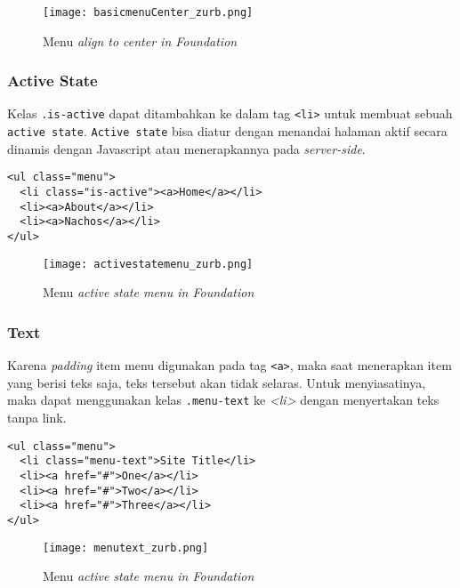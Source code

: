 \begin{enumerate}
\begin{figure} [H]
	\centering  
	\texttt{[image: basicmenuCenter\_zurb.png]}  
	\caption{Menu \textit{align to center in Foundation}}
	\label{fig:gridbasic_zurb} 
\end{figure}

\subsubsection{Active State}
\label{sssec:navigation_3}
Kelas \texttt{.is-active} dapat ditambahkan ke dalam tag \texttt{<li>} untuk membuat sebuah \texttt{active state}. \texttt{Active state} bisa diatur dengan  menandai halaman aktif secara dinamis dengan Javascript atau menerapkannya pada \textit{server-side}.\cite{zurbfoundation:17}

\begin{lstlisting}[frame=single] 
<ul class="menu">
  <li class="is-active"><a>Home</a></li>
  <li><a>About</a></li>
  <li><a>Nachos</a></li>
</ul>
\end{lstlisting}

\begin{figure} [H]
	\centering  
	\texttt{[image: activestatemenu\_zurb.png]}  
	\caption{Menu \textit{active state menu in Foundation}}
	\label{fig:activestate_zurb} 
\end{figure}


\subsubsection{Text}
\label{sssec:navigation_4}
Karena \textit{padding} item menu digunakan pada tag \texttt{<a>}, maka saat menerapkan item yang berisi teks saja, teks tersebut akan tidak selaras. Untuk menyiasatinya, maka dapat menggunakan kelas \texttt{.menu-text} ke \textit{<li>} dengan menyertakan teks tanpa link.\cite{zurbfoundation:17}

\begin{lstlisting}[frame=single]
 <ul class="menu">
  <li class="menu-text">Site Title</li>
  <li><a href="#">One</a></li>
  <li><a href="#">Two</a></li>
  <li><a href="#">Three</a></li>
</ul>
\end{lstlisting}

\begin{figure} [H]
	\centering  
	\texttt{[image: menutext\_zurb.png]}  
	\caption{Menu \textit{active state menu in Foundation}}
	\label{fig:activestate_zurb} 
\end{figure}


\end{enumerate}
